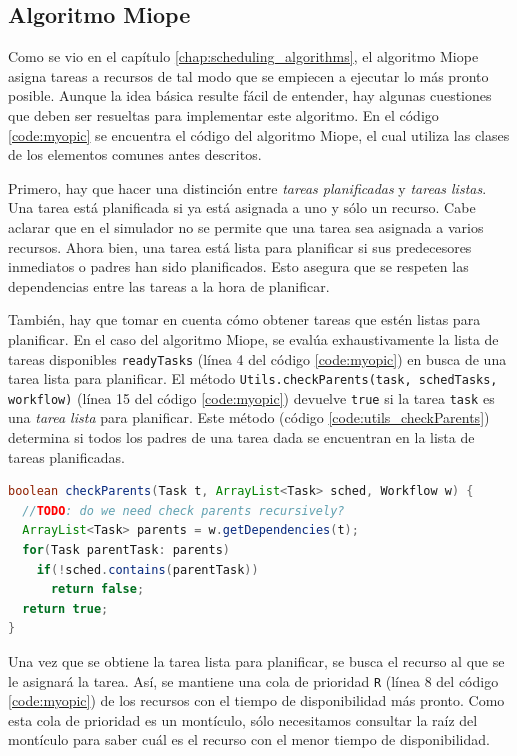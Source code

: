 \subsection{Algoritmo Miope}
Como se vio en el capítulo \ref{chap:scheduling_algorithms}, el algoritmo Miope asigna tareas a recursos de tal modo que se empiecen a ejecutar lo más pronto posible. Aunque la idea básica resulte fácil de entender, hay algunas cuestiones que deben ser resueltas para implementar este algoritmo. En el código \ref{code:myopic} se encuentra el código del algoritmo Miope, el cual utiliza las clases de los elementos comunes antes descritos. 

Primero, hay que hacer una distinción entre \emph{tareas planificadas} y \emph{tareas listas}. Una tarea está planificada si ya está asignada a uno y sólo un recurso. Cabe aclarar que en el simulador no se permite que una tarea sea asignada a varios recursos. Ahora bien, una tarea está lista para planificar si sus predecesores inmediatos o padres han sido planificados. Esto asegura que se respeten las dependencias entre las tareas a la hora de planificar.

También, hay que tomar en cuenta cómo obtener tareas que estén listas para planificar. En el caso del algoritmo Miope, se evalúa exhaustivamente la lista de tareas disponibles \texttt{readyTasks} (línea 4 del código \ref{code:myopic}) en busca de una tarea lista para planificar. El método \texttt{Utils.checkParents(task, schedTasks, workflow)} (línea 15 del código \ref{code:myopic}) devuelve \texttt{true} si la tarea \texttt{task} es una \emph{tarea lista} para planificar. Este método (código \ref{code:utils_checkParents}) determina si todos los padres de una tarea dada se encuentran en la lista de tareas planificadas.

\begin{lstlisting}[language=java,label={code:utils_checkParents},caption={Método que verifica si los padres de una tarea están planificados.},float]
boolean checkParents(Task t, ArrayList<Task> sched, Workflow w) {
  //TODO: do we need check parents recursively?
  ArrayList<Task> parents = w.getDependencies(t);
  for(Task parentTask: parents)
    if(!sched.contains(parentTask))
      return false;
  return true;
}
\end{lstlisting}

Una vez que se obtiene la tarea lista para planificar, se busca el recurso al que se le asignará la tarea. Así, se mantiene una cola de prioridad \texttt{R} (línea 8 del código \ref{code:myopic}) de los recursos con el tiempo de disponibilidad más pronto. Como esta cola de prioridad es un montículo, sólo necesitamos consultar la raíz del montículo para saber cuál es el recurso con el menor tiempo de disponibilidad. 

